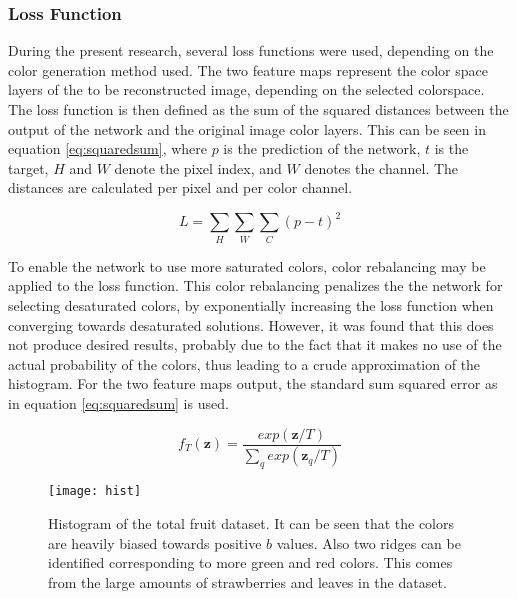 \subsubsection{Loss Function}
During the present research, several loss functions were used, depending on the color generation method used.
The two feature maps represent the color space layers of the to be reconstructed image, depending on the selected colorspace. The loss function is then defined as the sum of the squared distances between the output of the network and the original image color layers. This can be seen in equation \ref{eq:squaredsum}, where $p$ is the prediction of the network, $t$ is the target, $H$ and $W$ denote the pixel index, and $W$ denotes the channel. The distances are calculated per pixel and per color channel.

\begin{equation}
\label{eq:squaredsum}
L = \sum_{H}\sum_{W} \sum_{C}(p - t)^2
\end{equation}

To enable the network to use more saturated colors, color rebalancing may be applied to the loss function. This color rebalancing penalizes the the network for selecting desaturated colors, by exponentially increasing the loss function when converging towards desaturated solutions. However, it was found that this does not produce desired results, probably due to the fact that it makes no use of the actual probability of the colors, thus leading to a crude approximation of the histogram. For the two feature maps output, the standard sum squared error as in equation \ref{eq:squaredsum} is used.

\begin{equation}
f_{T}(\textbf{z})=\frac{exp(\textbf{z}/T)}{\sum_q^{}exp(\textbf{z}_{q}/T)}
\label{eq:anmean}
\end{equation}\begin{wrapfigure}{R}{0.5\textwidth}
	\vspace{-20pt}
	\begin{center}
		\texttt{[image: hist]}
	\end{center}
	\caption{Histogram of the total fruit dataset. It can be seen that the colors are heavily biased towards positive $b$ values. Also two ridges can be identified corresponding to more green and red colors. This comes from the large amounts of strawberries and leaves in the dataset.}
	\label{fig:histogram}
	\vspace{20pt}
\end{wrapfigure}

